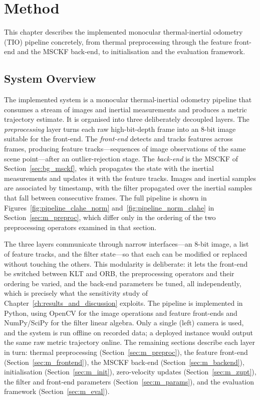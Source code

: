 \chapter{Method}
\label{ch:method}


This chapter describes the implemented monocular thermal-inertial odometry (TIO) pipeline concretely, from thermal preprocessing through the feature front-end and the MSCKF back-end, to initialisation and the evaluation framework.

\section{System Overview}
\label{sec:m_overview}
The implemented system is a monocular thermal-inertial odometry pipeline that consumes a stream of images and inertial measurements and produces a metric trajectory estimate. It is organised into three deliberately decoupled layers. The \emph{preprocessing} layer turns each raw high-bit-depth frame into an $8$-bit image suitable for the front-end. The \emph{front-end} detects and tracks features across frames, producing feature tracks---sequences of image observations of the same scene point---after an outlier-rejection stage. The \emph{back-end} is the MSCKF of Section~\ref{sec:bg_msckf}, which propagates the state with the inertial measurements and updates it with the feature tracks. Images and inertial samples are associated by timestamp, with the filter propagated over the inertial samples that fall between consecutive frames. The full pipeline is shown in Figures~\ref{fig:pipeline_clahe_norm} and~\ref{fig:pipeline_norm_clahe} in Section~\ref{sec:m_preproc}, which differ only in the ordering of the two preprocessing operators examined in that section.

The three layers communicate through narrow interfaces---an $8$-bit image, a list of feature tracks, and the filter state---so that each can be modified or replaced without touching the others. This modularity is deliberate: it lets the front-end be switched between KLT and ORB, the preprocessing operators and their ordering be varied, and the back-end parameters be tuned, all independently, which is precisely what the sensitivity study of Chapter~\ref{ch:results_and_discussion} exploits. The pipeline is implemented in Python, using OpenCV for the image operations and feature front-ends and NumPy/SciPy for the filter linear algebra. Only a single (left) camera is used, and the system is run offline on recorded data; a deployed instance would output the same raw metric trajectory online. The remaining sections describe each layer in turn: thermal preprocessing (Section~\ref{sec:m_preproc}), the feature front-end (Section~\ref{sec:m_frontend}), the MSCKF back-end (Section~\ref{sec:m_backend}), initialisation (Section~\ref{sec:m_init}), zero-velocity updates (Section~\ref{sec:m_zupt}), the filter and front-end parameters (Section~\ref{sec:m_params}), and the evaluation framework (Section~\ref{sec:m_eval}).

